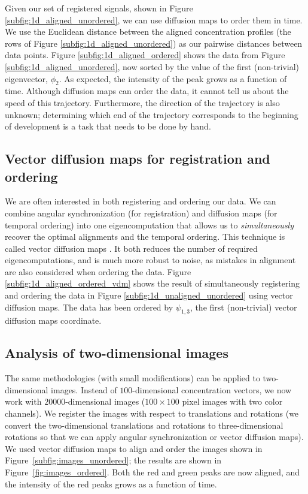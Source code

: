 \documentclass{pnastwo}
\begin{document}
\begin{article}
Given our set of registered signals, shown in Figure \ref{subfig:1d_aligned_unordered}, we can use diffusion maps to order them in time.
%
We use the Euclidean distance between the aligned concentration profiles (the rows of Figure \ref{subfig:1d_aligned_unordered}) as our pairwise distances between data points.
%
Figure \ref{subfig:1d_aligned_ordered} shows the data from Figure \ref{subfig:1d_aligned_unordered}, now sorted by the value of the first (non-trivial) eigenvector, $\phi_2$. 
%
As expected, the intensity of the peak grows as a function of time. 
%
Although diffusion maps can order the data, it cannot tell us about the speed of this trajectory.
%
Furthermore, the direction of the trajectory is also unknown; determining which end of the trajectory corresponds to the beginning of development is a task that needs to be done by hand.

\subsection{Vector diffusion maps for registration and ordering}

We are often interested in both registering and ordering our data.
%
%
We can combine angular synchronization (for registration) and diffusion maps (for temporal ordering) into one eigencomputation that allows us to {\em simultaneously} recover the optimal alignments and the temporal ordering.
%
This technique is called vector diffusion maps \cite{singer2012vector}.
%
It both reduces the number of required eigencomputations, and is much more robust to noise, as mistakes in alignment are also considered when ordering the data.
%
Figure \ref{subfig:1d_aligned_ordered_vdm} shows the result of simultaneously registering and ordering the data in Figure \ref{subfig:1d_unaligned_unordered} using vector diffusion maps. 
%
The data has been ordered by $\psi_{1, 3}$, the first (non-trivial) vector diffusion maps coordinate. 

\subsection{Analysis of two-dimensional images}

The same methodologies (with small modifications) can be applied to two-dimensional images.
%
Instead of $100$-dimensional concentration vectors, we now work with $20000$-dimensional images ($100 \times 100$ pixel images with two color channels).
%
We register the images with respect to translations and rotations 
(we convert the two-dimensional translations and rotations to three-dimensional rotations so that we can apply angular synchronization or vector diffusion maps). 
%
We used vector diffusion maps to align and order the images shown in Figure~\ref{subfig:images_unordered};
the results are shown in Figure~\ref{fig:images_ordered}.
%
Both the red and green peaks are now aligned, and the intensity of the red peaks grows as a function of time.


\end{article}
\end{document}
